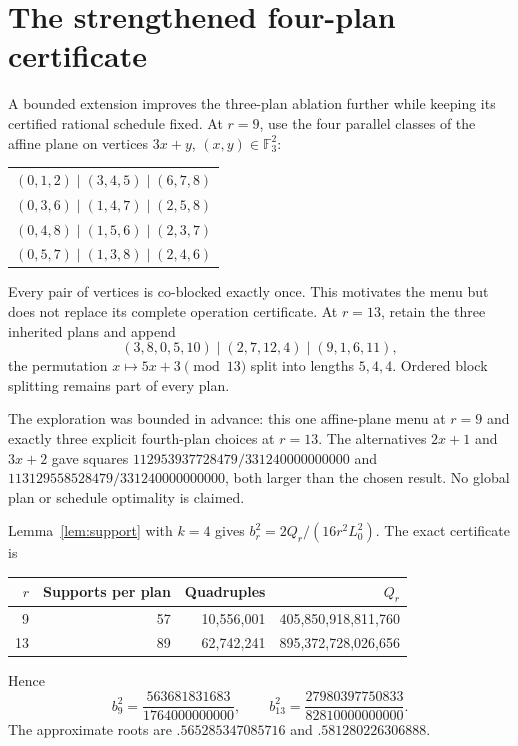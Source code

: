 \documentclass[11pt,letterpaper]{article}
\theoremstyle{remark}\newtheorem{remark}[theorem]{Remark}
\begin{document}
\section{The strengthened four-plan certificate}
\label{sec:four}
A bounded extension improves the three-plan ablation further while keeping its certified rational schedule fixed. At $r=9$, use the four parallel classes of the affine plane on vertices $3x+y$, $(x,y)\in\mathbb F_3^2$:
\begin{center}\small
\begin{tabular}{@{}l@{}}\toprule
$(0,1,2)\mid(3,4,5)\mid(6,7,8)$\\
$(0,3,6)\mid(1,4,7)\mid(2,5,8)$\\
$(0,4,8)\mid(1,5,6)\mid(2,3,7)$\\
$(0,5,7)\mid(1,3,8)\mid(2,4,6)$\\\bottomrule
\end{tabular}
\end{center}
Every pair of vertices is co-blocked exactly once. This motivates the menu but does not replace its complete operation certificate. At $r=13$, retain the three inherited plans and append
\[
 (3,8,0,5,10)\mid(2,7,12,4)\mid(9,1,6,11),
\]
the permutation $x\mapsto5x+3\pmod {13}$ split into lengths $5,4,4$. Ordered block splitting remains part of every plan.

The exploration was bounded in advance: this one affine-plane menu at $r=9$ and exactly three explicit fourth-plan choices at $r=13$. The alternatives $2x+1$ and $3x+2$ gave squares $112953937728479/331240000000000$ and $113129558528479/331240000000000$, both larger than the chosen result. No global plan or schedule optimality is claimed.

Lemma~\ref{lem:support} with $k=4$ gives $b_r^2=2Q_r/(16r^2L_0^2)$. The exact certificate is
\begin{center}\small
\begin{tabular}{@{}rrrr@{}}\toprule
$r$ & Supports per plan & Quadruples & $Q_r$\\\midrule
9&57&10,556,001&405,850,918,811,760\\
13&89&62,742,241&895,372,728,026,656\\\bottomrule
\end{tabular}
\end{center}
Hence
\begin{equation}\label{eq:b4}
 b_9^2=\frac{563681831683}{1764000000000},\qquad
 b_{13}^2=\frac{27980397750833}{82810000000000}.
\end{equation}
The approximate roots are $.565285347085716$ and $.581280226306888$.
\end{document}
